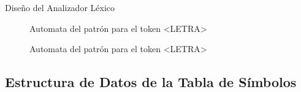 \documentclass[14pt, aspectratio=169]{beamer}
\begin{document}
\begin{frame}{Diseño del Analizador Léxico}
{\begin{figure}[ht]
\begin{minipage}{0.5\linewidth}
\begin{mdframed}
                \end{mdframed}
                \label{fig: letraAutomata}
                \caption{Automata del patrón para el token <LETRA>}
            \end{minipage}
        \end{figure}
    }
     {
        \begin{figure}
            \begin{minipage}{0.6\linewidth}
                \begin{mdframed}
                \end{mdframed}
                \label{fig: digitoAutomata}
                \caption{Automata del patrón para el token <LETRA>}
            \end{minipage}
        \end{figure}
    }
\end{frame}

\subsection{Estructura de Datos de la Tabla de Símbolos}
\end{document}
